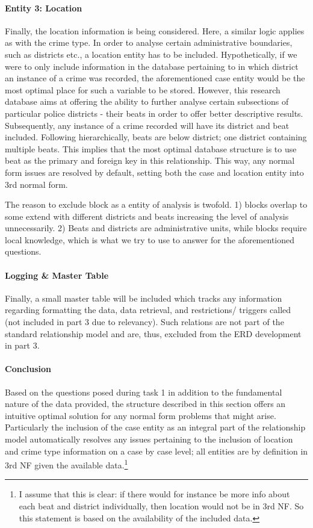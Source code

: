 \documentclass[a4paper]{article}
\begin{document}
\paragraph{Entity 3: Location} Finally, the location information is being considered. Here, a similar logic applies as with the crime type. In order to analyse certain administrative boundaries, such as districts etc., a location entity has to be included. Hypothetically, if we were to only include information in the database pertaining to in which district an instance of a crime was recorded, the aforementioned case entity would be the most optimal place for such a variable to be stored. However, this research database aims at offering the ability to further analyse certain subsections of particular police districts - their beats in order to offer better descriptive results. 
Subsequently, any instance of a crime recorded will have its district and beat included. Following hierarchically, beats are below district; one district containing multiple beats. This implies that the most optimal database structure is to use beat as the primary and foreign key in this relationship. This way, any normal form issues are resolved by default, setting both the case and location entity into 3rd normal form. 

The reason to exclude block as a entity of analysis is twofold. 1) blocks overlap to some extend with different districts and beats increasing the level of analysis unnecessarily. 2) Beats and districts are administrative units, while blocks require local knowledge, which is what we try to use to answer for the aforementioned questions. 


\paragraph{Logging \& Master Table} Finally, a small master table will be included which tracks any information regarding formatting the data, data retrieval, and restrictions/ triggers called (not included in part 3 due to relevancy). Such relations are not part of the standard relationship model and are, thus, excluded from the ERD development in part 3. 


\paragraph{Conclusion} Based on the questions posed during task 1 in addition to the fundamental nature of the data provided, the structure described in this section offers an intuitive optimal solution for any normal form problems that might arise. Particularly the inclusion of the case entity as an integral part of the relationship model automatically resolves any issues pertaining to the inclusion of location and crime type information on a case by case level; all entities are by definition in 3rd NF given the available data.\footnote{I assume that this is clear: if there would for instance be more info about each beat and district individually, then location would not be in 3rd NF. So this statement is based on the availability of the included data.} 
\end{document}
